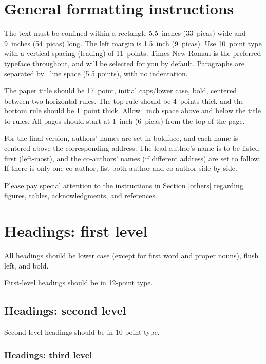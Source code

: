 \documentclass{article}
\begin{document}
\section{General formatting instructions}
\label{gen_inst}


The text must be confined within a rectangle 5.5~inches (33~picas) wide and
9~inches (54~picas) long. The left margin is 1.5~inch (9~picas).  Use 10~point
type with a vertical spacing (leading) of 11~points.  Times New Roman is the
preferred typeface throughout, and will be selected for you by default.
Paragraphs are separated by ~line space (5.5 points), with no
indentation.


The paper title should be 17~point, initial caps/lower case, bold, centered
between two horizontal rules. The top rule should be 4~points thick and the
bottom rule should be 1~point thick. Allow ~inch space above and
below the title to rules. All pages should start at 1~inch (6~picas) from the
top of the page.


For the final version, authors' names are set in boldface, and each name is
centered above the corresponding address. The lead author's name is to be listed
first (left-most), and the co-authors' names (if different address) are set to
follow. If there is only one co-author, list both author and co-author side by
side.


Please pay special attention to the instructions in Section \ref{others}
regarding figures, tables, acknowledgments, and references.


\section{Headings: first level}
\label{headings}


All headings should be lower case (except for first word and proper nouns),
flush left, and bold.


First-level headings should be in 12-point type.


\subsection{Headings: second level}


Second-level headings should be in 10-point type.


\subsubsection{Headings: third level}
\end{document}
